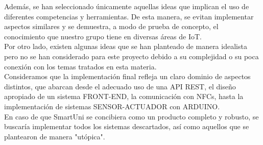 \documentclass[12pt]{report}
\begin{document}
Además, se han seleccionado únicamente aquellas ideas que implican el uso de diferentes competencias y herramientas. De esta manera, se evitan implementar aspectos similares y se demuestra, a modo de prueba de concepto, el conocimiento que nuestro grupo tiene en diversas áreas de IoT.
\\

Por otro lado, existen algunas ideas que se han planteado de manera idealista pero no se han considerado para este proyecto debido a su complejidad o su poca conexión con los temas tratados en esta materia.
\\

Consideramos que la implementación final refleja un claro dominio de aspectos distintos, que abarcan desde el adecuado uso de una API REST, el diseño apropiado de un sistema FRONT-END, la comunicación con NFCs, hasta la implementación de sistemas SENSOR-ACTUADOR con ARDUINO.
\\

En caso de que SmartUni se concibiera como un producto completo y robusto, se buscaría implementar todos los sistemas descartados, así como aquellos que se plantearon de manera "utópica".
\\
\end{document}
